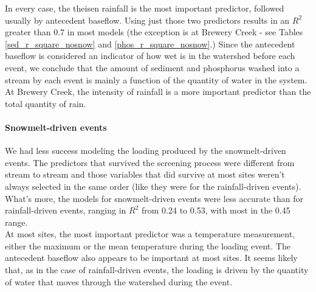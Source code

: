 \documentclass[10pt]{article}
\begin{document}
In every case, the theisen rainfall is the most important predictor, followed usually by antecedent baseflow. Using just those two predictors results in an $R^2$ greater than 0.7 in most models (the exception is at Brewery Creek - see Tables \ref{sed_r_square_nosnow} and \ref{phos_r_square_nosnow}.) Since the antecedent baseflow is considered an indicator of how wet is in the watershed before each event, we conclude that the amount of sediment and phosphorus washed into a stream by each event is mainly a function of the quantity of water in the system. At Brewery Creek, the intensity of rainfall is a more important predictor than the total quantity of rain.\\

\paragraph{Snowmelt-driven events} We had less success modeling the loading produced by the snowmelt-driven events. The predictors that survived the screening process were different from stream to stream and those variables that did survive at most sites weren't always selected in the same order (like they were for the rainfall-driven events). What's more, the models for snowmelt-driven events were less accurate than for rainfall-driven events, ranging in $R^2$ from 0.24 to 0.53, with most in the 0.45 range.\\

At most sites, the most important predictor was a temperature measurement, either the maximum or the mean temperature during the loading event. The antecedent baseflow also appears to be important at most sites. It seems likely that, as in the case of rainfall-driven events, the loading is driven by the quantity of water that moves through the watershed during the event.
\end{document}
